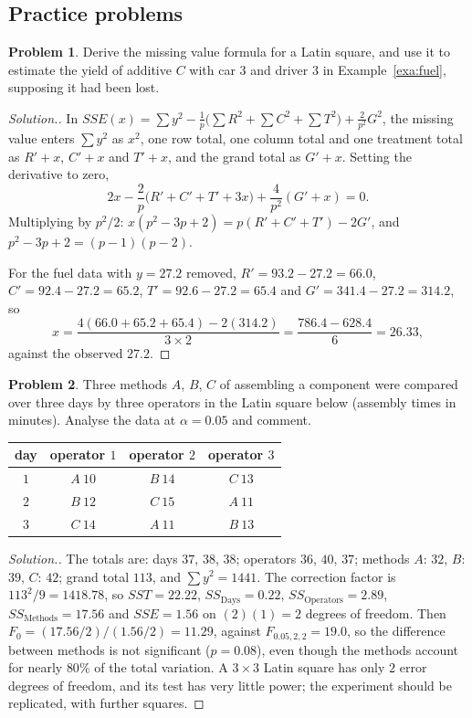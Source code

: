 \documentclass[11pt,a4paper]{article}
\numberwithin{equation}{section}
\theoremstyle{definition}
\newtheorem{problemx}{Problem}[subsection]
\newenvironment{problem}{\begin{problemx}}{\end{problemx}}
\newenvironment{solution}
  {\renewcommand{\qedsymbol}{}\begin{proof}[\textit{Solution}.]}
  {\end{proof}}
\begin{document}
\subsection{Practice problems}

\begin{problem}\label{prob:latin-missing}
Derive the missing value formula for a Latin square, and use it to estimate the yield of additive $C$ with car $3$ and driver $3$ in
Example~\ref{exa:fuel}, supposing it had been lost.
\end{problem}

\begin{solution}
In $SSE(x) = \sum y^2 - \frac1p\bigl(\sum R^2 + \sum C^2 + \sum T^2\bigr) + \frac{2}{p^2}G^2$, the missing value enters $\sum y^2$ as $x^2$, one row total, one column total and one treatment total
as $R' + x$, $C' + x$ and $T' + x$, and the grand total as $G' + x$. Setting the derivative to zero,
\[
2x - \frac2p\bigl(R' + C' + T' + 3x\bigr) + \frac{4}{p^2}(G' + x) = 0 .
\]
Multiplying by $p^2/2$: $x(p^2 - 3p + 2) = p(R' + C' + T') - 2G'$, and $p^2 - 3p + 2 = (p - 1)(p - 2)$.

For the fuel data with $y = 27.2$ removed, $R' = 93.2 - 27.2 = 66.0$, $C' = 92.4 - 27.2 = 65.2$, $T' = 92.6 - 27.2 = 65.4$ and $G' = 341.4 - 27.2 = 314.2$, so
\[
\hat x = \frac{4(66.0 + 65.2 + 65.4) - 2(314.2)}{3 \times 2} = \frac{786.4 - 628.4}{6} = 26.33 ,
\]
against the observed $27.2$.
\end{solution}

\begin{problem}
Three methods $A$, $B$, $C$ of assembling a component were compared over three days by three operators in the Latin square below (assembly
times in minutes). Analyse the data at $\alpha = 0.05$ and comment.
\begin{center}
\begin{tabular}{c|ccc}
day & operator $1$ & operator $2$ & operator $3$ \\
\hline
$1$ & $A\ 10$ & $B\ 14$ & $C\ 13$ \\
$2$ & $B\ 12$ & $C\ 15$ & $A\ 11$ \\
$3$ & $C\ 14$ & $A\ 11$ & $B\ 13$
\end{tabular}
\end{center}
\end{problem}

\begin{solution}
The totals are: days $37$, $38$, $38$; operators $36$, $40$, $37$; methods $A$: $32$, $B$: $39$, $C$: $42$; grand total $113$, and $\sum y^2 = 1441$. The correction factor is
$113^2/9 = 1418.78$, so $SST = 22.22$, $SS_{\mathrm{Days}} = 0.22$, $SS_{\mathrm{Operators}} = 2.89$, $SS_{\mathrm{Methods}} = 17.56$ and $SSE = 1.56$ on $(2)(1) = 2$ degrees of freedom.
Then $F_0 = (17.56/2)/(1.56/2) = 11.29$, against $F_{0.05,2,2} = 19.0$, so the difference between methods is not significant ($p = 0.08$), even though the methods
account for nearly $80\%$ of the total variation. A $3 \times 3$ Latin square has only $2$ error degrees of freedom, and its test has very little power;
the experiment should be replicated, with further squares.
\end{solution}
\end{document}
